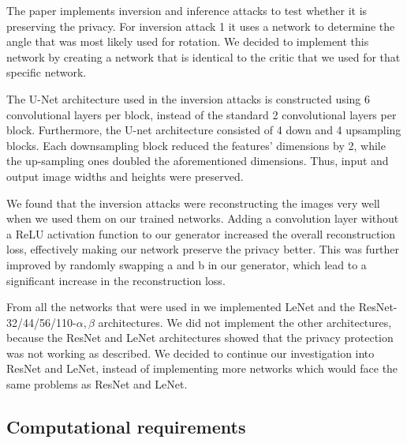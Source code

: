 The paper implements inversion and inference attacks to test whether it is preserving the privacy. For inversion attack 1 it uses a network to determine the angle that was most likely used for rotation. We decided to implement this network by creating a network that is identical to the critic that we used for that specific network.

The U-Net architecture used in the inversion attacks is constructed using 6 convolutional layers per block, instead of the standard 2 convolutional layers per block. Furthermore, the U-net architecture consisted of 4 down and 4 upsampling blocks. Each downsampling block reduced the features' dimensions by 2, while the up-sampling ones doubled the aforementioned dimensions. Thus, input and output image widths and heights were preserved.

We found that the inversion attacks were reconstructing the images very well when we used them on our trained networks. Adding a convolution layer without a ReLU activation function to our generator increased the overall reconstruction loss, effectively making our network preserve the privacy better. This was further improved by randomly swapping a and b in our generator, which lead to a significant increase in the reconstruction loss.

From all the networks that were used in \cite{xiang2020interpretable} we implemented LeNet and the ResNet-32/44/56/110-$\alpha, \beta$ architectures. We did not implement the other architectures, because the ResNet and LeNet architectures showed that the privacy protection was not working as described. We decided to continue our investigation into ResNet and LeNet, instead of implementing more networks which would face the same problems as ResNet and LeNet.


\subsection{Computational requirements}

